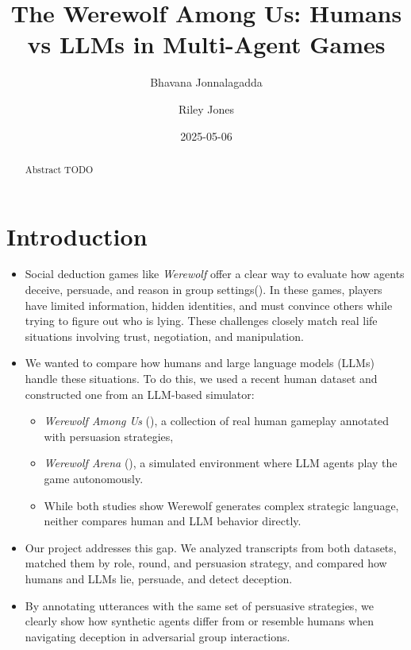 \documentclass[
  letterpaper,
  DIV=11,
  numbers=noendperiod]{scrreprt}
\title{The Werewolf Among Us: Humans vs LLMs in Multi-Agent Games}
\author{Bhavana Jonnalagadda \and Riley Jones}
\date{2025-05-06}
\providecommand{\tightlist}{%
  \setlength{\itemsep}{0pt}\setlength{\parskip}{0pt}}
\renewcommand*\contentsname{Table of contents}
\newcommand\contentsname{Table of contents}
\begin{document}
\maketitle
\begin{abstract}
Abstract TODO
\end{abstract}

\renewcommand*\contentsname{Table of contents}
{
\hypersetup{linkcolor=}
\setcounter{tocdepth}{2}
\tableofcontents
}

\chapter{Introduction}\label{introduction}

\begin{itemize}
\item
  Social deduction games like \emph{Werewolf} offer a clear way to
  evaluate how agents deceive, persuade, and reason in group
  settings(). In
  these games, players have limited information, hidden identities, and
  must convince others while trying to figure out who is lying. These
  challenges closely match real life situations involving trust,
  negotiation, and manipulation.
\item
  We wanted to compare how humans and large language models (LLMs)
  handle these situations. To do this, we used a recent human dataset
  and constructed one from an LLM-based simulator:

  \begin{itemize}
  \tightlist
  \item
    \emph{Werewolf Among Us}
    (), a
    collection of real human gameplay annotated with persuasion
    strategies,
  \item
    \emph{Werewolf Arena}
    (), a simulated environment where LLM agents play the game
    autonomously.
  \item
    While both studies show Werewolf generates complex strategic
    language, neither compares human and LLM behavior directly.
  \end{itemize}
\item
  Our project addresses this gap. We analyzed transcripts from both
  datasets, matched them by role, round, and persuasion strategy, and
  compared how humans and LLMs lie, persuade, and detect deception.
\item
  By annotating utterances with the same set of persuasive strategies,
  we clearly show how synthetic agents differ from or resemble humans
  when navigating deception in adversarial group interactions.
\end{itemize}
\end{document}

